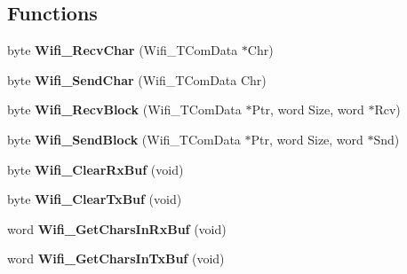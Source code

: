 \subsection*{Functions}
\begin{DoxyCompactItemize}
\item 
\hypertarget{group___wifi__module_gaa5f6d50c32a7f5fe45fa12276ed94bf9}{byte {\bfseries Wifi\-\_\-\-Recv\-Char} (Wifi\-\_\-\-T\-Com\-Data $\ast$Chr)}\label{group___wifi__module_gaa5f6d50c32a7f5fe45fa12276ed94bf9}

\item 
\hypertarget{group___wifi__module_ga4f1333910672b8ff8b8d76b6c57df9dc}{byte {\bfseries Wifi\-\_\-\-Send\-Char} (Wifi\-\_\-\-T\-Com\-Data Chr)}\label{group___wifi__module_ga4f1333910672b8ff8b8d76b6c57df9dc}

\item 
\hypertarget{group___wifi__module_gabc214b66421221461346a9fcb35629b0}{byte {\bfseries Wifi\-\_\-\-Recv\-Block} (Wifi\-\_\-\-T\-Com\-Data $\ast$Ptr, word Size, word $\ast$Rcv)}\label{group___wifi__module_gabc214b66421221461346a9fcb35629b0}

\item 
\hypertarget{group___wifi__module_ga101cfb9a1f1aef952427b2cf8d258ecd}{byte {\bfseries Wifi\-\_\-\-Send\-Block} (Wifi\-\_\-\-T\-Com\-Data $\ast$Ptr, word Size, word $\ast$Snd)}\label{group___wifi__module_ga101cfb9a1f1aef952427b2cf8d258ecd}

\item 
\hypertarget{group___wifi__module_gaec8c0e3fe6338f12177bee604b0b8c05}{byte {\bfseries Wifi\-\_\-\-Clear\-Rx\-Buf} (void)}\label{group___wifi__module_gaec8c0e3fe6338f12177bee604b0b8c05}

\item 
\hypertarget{group___wifi__module_ga432e1b0d4beb0d6d736760a7593e36a8}{byte {\bfseries Wifi\-\_\-\-Clear\-Tx\-Buf} (void)}\label{group___wifi__module_ga432e1b0d4beb0d6d736760a7593e36a8}

\item 
\hypertarget{group___wifi__module_ga494555d44877053c0f46da0ba21995be}{word {\bfseries Wifi\-\_\-\-Get\-Chars\-In\-Rx\-Buf} (void)}\label{group___wifi__module_ga494555d44877053c0f46da0ba21995be}

\item 
\hypertarget{group___wifi__module_gadf7750d3ec25828fb5b0d2d4f9ea5ff1}{word {\bfseries Wifi\-\_\-\-Get\-Chars\-In\-Tx\-Buf} (void)}\label{group___wifi__module_gadf7750d3ec25828fb5b0d2d4f9ea5ff1}


\end{DoxyCompactItemize}
